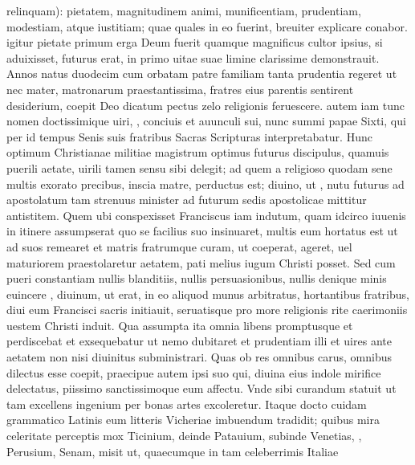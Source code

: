\documentclass[a5paper,twoside]{article}
\begin{document}
relinquam): pietatem, magnitudinem animi, munificentiam, prudentiam, modestiam, atque iustitiam; quae quales in eo fuerint, breuiter explicare conabor.  igitur pietate primum erga Deum fuerit quamque magnificus cultor ipsius, si aduixisset, futurus erat, in primo uitae suae limine clarissime demonstrauit. Annos natus duodecim cum orbatam patre familiam tanta prudentia regeret ut nec mater, matronarum praestantissima, fratres eius parentis sentirent desiderium, coepit Deo dicatum pectus zelo religionis feruescere.  autem iam tunc nomen  doctissimique uiri, , conciuis et auunculi sui, nunc summi  papae Sixti, qui per id tempus Senis suis fratribus Sacras Scripturas interpretabatur. Hunc optimum Christianae militiae magistrum optimus futurus discipulus, quamuis puerili aetate, uirili tamen sensu sibi delegit; ad quem a religioso quodam sene multis exorato precibus, inscia matre, perductus est; diuino, ut , nutu futurus ad apostolatum tam strenuus minister ad futurum sedis apostolicae mittitur antistitem. Quem ubi conspexisset Franciscus iam   indutum, quam idcirco iuuenis in itinere assumpserat quo se facilius  suo insinuaret, multis eum hortatus est ut ad suos remearet et matris fratrumque curam, ut coeperat, ageret, uel maturiorem  praestolaretur aetatem,  pati melius iugum Christi posset. Sed cum pueri constantiam nullis blanditiis, nullis persuasionibus, nullis denique minis euincere , diuinum, ut erat, in eo aliquod munus arbitratus, hortantibus fratribus, diui eum Francisci sacris initiauit, seruatisque pro more religionis rite caerimoniis uestem Christi induit. Qua assumpta ita omnia  libens promptusque et perdiscebat et exsequebatur ut nemo dubitaret et prudentiam illi et uires ante aetatem non nisi diuinitus subministrari. Quas ob res omnibus carus, omnibus dilectus esse coepit, praecipue autem ipsi  suo qui, diuina eius indole mirifice delectatus, piissimo sanctissimoque eum  affectu. Vnde sibi curandum statuit ut tam excellens ingenium per bonas artes excoleretur. Itaque docto cuidam grammatico Latinis eum litteris Vicheriae imbuendum tradidit; quibus mira celeritate perceptis mox Ticinium, deinde Patauium, subinde Venetias, , Perusium, Senam,  misit ut, quaecumque in tam celeberrimis Italiae 
\end{document}

